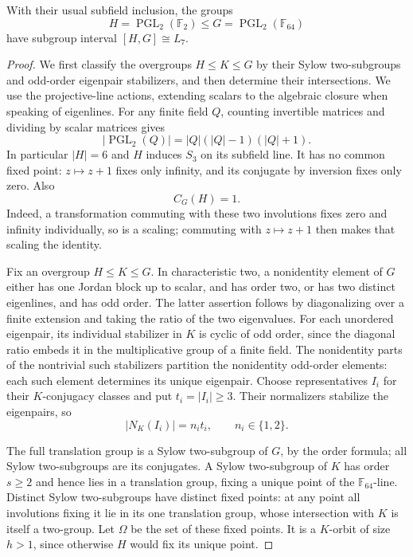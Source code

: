\begin{proposition}\label{f:prop-l7-interval}
With their usual subfield inclusion, the groups
\[
 H=\operatorname{PGL}_2(\mathbb F_2)
 \le G=\operatorname{PGL}_2(\mathbb F_{64})
\]
have subgroup interval $[H,G]\cong L_7$.
\end{proposition}
\begin{proof}
We first classify the overgroups $H\le K\le G$ by their Sylow
two-subgroups and odd-order eigenpair stabilizers, and then determine
their intersections.
We use the projective-line actions, extending scalars to the algebraic
closure when speaking of eigenlines. For any finite field $Q$, counting
invertible matrices and dividing by scalar matrices gives
\[
 |\operatorname{PGL}_2(Q)|=|Q|(|Q|-1)(|Q|+1).
\]
In particular $|H|=6$ and $H$ induces $S_3$ on its subfield line. It has no
common fixed point: $z\mapsto z+1$ fixes only infinity, and its conjugate by
inversion fixes only zero. Also
\begin{equation}\label{f:eq-centralizer-h}
 C_G(H)=1.
\end{equation}
Indeed, a transformation commuting with these two involutions fixes zero and
infinity individually, so is a scaling; commuting with $z\mapsto z+1$ then
makes that scaling the identity.

Fix an overgroup $H\le K\le G$. In characteristic two, a nonidentity element
of $G$ either has one Jordan block up to scalar, and has order two, or has
two distinct eigenlines, and has odd order. The latter assertion follows by
diagonalizing over a finite extension and taking the ratio of the two
eigenvalues. For each unordered eigenpair, its individual stabilizer in
$K$ is cyclic of odd order, since the diagonal ratio embeds it in the
multiplicative group of a finite field. The nonidentity parts of the
nontrivial such stabilizers partition the nonidentity odd-order elements:
each such element determines its unique eigenpair. Choose representatives
$I_i$ for their $K$-conjugacy classes and put $t_i=|I_i|\ge3$. Their
normalizers stabilize the eigenpairs, so
\[
 |N_K(I_i)|=n_i t_i,\qquad n_i\in\{1,2\}.
\]

The full translation group is a Sylow two-subgroup of $G$, by the order
formula; all Sylow two-subgroups are its conjugates. A Sylow two-subgroup of
$K$ has order $s\ge2$ and hence lies in a translation group, fixing a unique
point of the $\mathbb F_{64}$-line. Distinct Sylow two-subgroups have distinct
fixed points: at any point all involutions fixing it lie in its one
translation group, whose intersection with $K$ is itself a two-group. Let
$\Omega$ be the set of these fixed points. It is a $K$-orbit of size $h>1$,
since otherwise $H$ would fix its unique point.


\end{proof}
